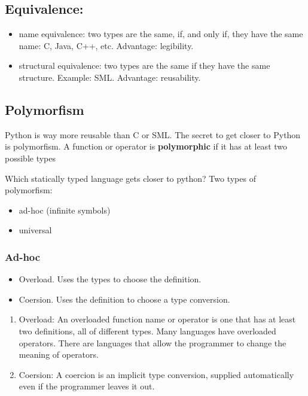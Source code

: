 \documentclass[11pt]{article}
\begin{document}
\subsection{Equivalence:}
\label{sec:org0867b8a}
\begin{itemize}
\item name equivalence: two types are the same, if, and only if, they have the
same name: C, Java, C++, etc. Advantage: legibility.
\item structural equivalence: two types are the same if they have the same
structure. Example: SML. Advantage: reusability.
\end{itemize}

\subsection{Polymorfism}
\label{sec:org80887d9}
Python is way more reusable than C or SML. The secret to get closer to Python is
polymorfism. A function or operator is \textbf{polymorphic} if it has at least two possible
types

Which statically typed language gets closer to python? Two types of polymorfism:
\begin{itemize}
\item ad-hoc (infinite symbols)
\item universal
\end{itemize}

\subsubsection{Ad-hoc}
\label{sec:org8d22975}
\begin{itemize}
\item Overload. Uses the types to choose the definition.
\item Coersion. Uses the definition to choose a type conversion.
\end{itemize}

\begin{enumerate}
\item Overload:
\label{sec:orgd87a5d5}
An overloaded function name or operator is one that has at least two definitions, all
of different types. Many languages have overloaded operators. There are languages
that allow the programmer to change the meaning of operators.

\item Coersion:
\label{sec:orgc33f0dc}
A coercion is an implicit type conversion, supplied automatically even if the
programmer leaves it out.
\end{enumerate}
\end{document}
